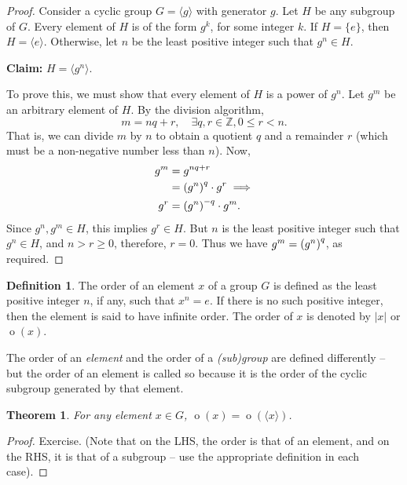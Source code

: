 \documentclass[svgnames]{article}
\newtheorem{Theorem}{Theorem}[section]
\theoremstyle{definition}
\newtheorem{Definition}[Definition]{Definition}
\theoremstyle{remark}
\DeclareMathOperator{\ord}{o}
\newcommand{\newterm}[1]{{\color{alertcolor} #1}}
\begin{document}
\begin{proof}
Consider a cyclic group $G = \langle g \rangle$ with generator $g$. Let $H$ be any subgroup of $G$. Every element of $H$ is of the form $g^k$, for some integer $k$. If $H = \{e\}$, then $H = \langle e \rangle$. Otherwise, let $n$ be the least positive integer such that $g^n \in H$.

\textbf{Claim:} $H = \langle g^n \rangle$.

To prove this, we must show that every element of $H$ is a power of $g^n$. Let $g^m$ be an arbitrary element of $H$. By the division algorithm,
\begin{equation*}
m = nq + r, \quad \exists q, r \in \mathbb Z, 0 \le r < n.
\end{equation*}
That is, we can divide $m$ by $n$ to obtain a quotient $q$ and a remainder $r$ (which must be a non-negative number less than $n$). Now,
\begin{align*}
g^m & = g^{nq + r} \\
	& = \pqty{g^n}^q \cdot g^r \implies \\
g^r & = \pqty{g^n}^{-q} \cdot g^m.
\end{align*}
Since $g^n, g^m \in H$, this implies $g^r \in H$. But $n$ is the least positive integer such that $g^n \in H$, and $n > r \ge 0$, therefore, $r = 0$. Thus we have $g^m = \pqty{g^n}^q$, as required.
\end{proof}

\begin{Definition}\label{def:OrdElem}
The \newterm{order} of an element $x$ of a group $G$ is defined as the least positive integer $n$, if any, such that $x^n = e$. If there is no such positive integer, then the element is said to have infinite order. The order of $x$ is denoted by $|x|$ or $\ord(x)$.
\end{Definition}

The order of an \emph{element} and the order of a \emph{(sub)group} are defined differently -- but the order of an element is called so because it is the order of the cyclic subgroup generated by that element.

\begin{Theorem}
For any element $x \in G$, $\ord(x) = \ord(\langle x \rangle)$.
\end{Theorem}

\begin{proof}
Exercise. (Note that on the LHS, the order is that of an element, and on the RHS, it is that of a subgroup -- use the appropriate definition in each case).
\end{proof}
\end{document}
